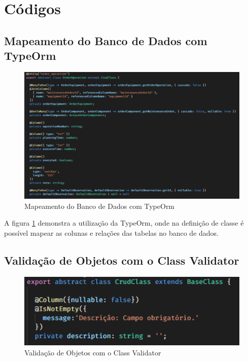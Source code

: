 \section{Códigos}

\newpage
\subsection{Mapeamento do Banco de Dados com TypeOrm}

\begin{figure}[htb]
	\caption{\label{code_server_type-orm}Mapeamento do Banco de Dados com TypeOrm}
	\begin{center}
		\includegraphics[scale=0.60]{./Figuras/code/server/type-orm.png}
	\end{center}
\end{figure}

A figura \ref{code_server_type-orm} demonstra a utilização da TypeOrm, onde na definição de classe é possível mapear as colunas e relações das tabelas no banco de dados.

\newpage
\subsection{Validação de Objetos com o Class Validator}

\begin{figure}[htb]
	\caption{\label{code_server_class-validator}Validação de Objetos com o Class Validator}
	\begin{center}
		\includegraphics[scale=1.30]{./Figuras/code/server/class-validator.png}
	\end{center}
\end{figure}

